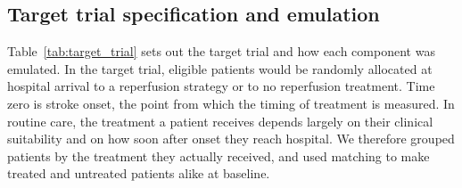 \subsection{Target trial specification and emulation}

Table~\ref{tab:target_trial} sets out the target trial and how each component was emulated. In the target trial, eligible patients would be randomly allocated at hospital arrival to a reperfusion strategy or to no reperfusion treatment. Time zero is stroke onset, the point from which the timing of treatment is measured. In routine care, the treatment a patient receives depends largely on their clinical suitability and on how soon after onset they reach hospital. We therefore grouped patients by the treatment they actually received, and used matching to make treated and untreated patients alike at baseline.

